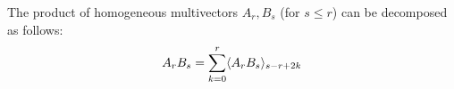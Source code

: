 \begin{theorem}\label{t:homog-product}
	The product of homogeneous multivectors $A_r, B_s$ (for $s \leq r$) can be decomposed as follows:
	\[A_rB_s = \sum_{k=0}^r \langle A_rB_s \rangle_{s-r+2k}\]
\end{theorem}
